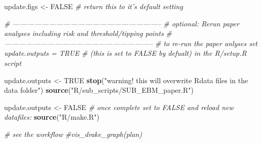 \documentclass[]{article}
\newenvironment{Shaded}{\begin{snugshade}}{\end{snugshade}}
\newcommand{\KeywordTok}[1]{\textcolor[rgb]{0.13,0.29,0.53}{\textbf{{#1}}}}
\newcommand{\StringTok}[1]{\textcolor[rgb]{0.31,0.60,0.02}{{#1}}}
\newcommand{\CommentTok}[1]{\textcolor[rgb]{0.56,0.35,0.01}{\textit{{#1}}}}
\newcommand{\OtherTok}[1]{\textcolor[rgb]{0.56,0.35,0.01}{{#1}}}
\newcommand{\NormalTok}[1]{{#1}}
\begin{document}
\begin{Shaded}
\begin{Highlighting}[]
    \NormalTok{update.figs  <-}\StringTok{ }\OtherTok{FALSE}   \CommentTok{# return this to it's default setting}
    
    
    \CommentTok{# --------------------------------------------------------------}
    \CommentTok{# optional: Rerun paper analyses including risk and threshold/tipping points}
    \CommentTok{# --------------------------------------------------------------}
    \CommentTok{# to re-run the paper anlyses set update.outputs = TRUE }
    \CommentTok{# (this is set to FALSE by defualt) in the R/setup.R script}
    
    \NormalTok{update.outputs  <-}\StringTok{ }\OtherTok{TRUE}  
    \KeywordTok{stop}\NormalTok{(}\StringTok{"warning! this will overwrite Rdata files in the data folder"}\NormalTok{)}
    \KeywordTok{source}\NormalTok{(}\StringTok{"R/sub_scripts/SUB_EBM_paper.R"}\NormalTok{)}
    
    \NormalTok{update.outputs  <-}\StringTok{ }\OtherTok{FALSE}  \CommentTok{# once complete set to FALSE and reload new datafiles:}
    \KeywordTok{source}\NormalTok{(}\StringTok{"R/make.R"}\NormalTok{)}
    
   
    \CommentTok{# see the workflow}
    \CommentTok{#vis_drake_graph(plan)}
\end{Highlighting}
\end{Shaded}
\end{document}
